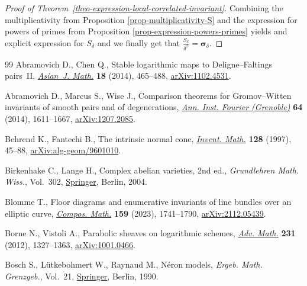 \documentclass[11pt]{article}
\numberwithin{equation}{section}
\numberwithin{equation}{section}
\theoremstyle{definition}
\begin{document}
\begin{proof}[Proof of Theorem~\ref{theo-expression-local-correlated-invariant}]
Combining the multiplicativity from Proposition \ref{prop-multiplicativity-S} and the expression for powers of primes from Proposition \ref{prop-expression-powers-primes} yields and explicit expression for $S_\delta$ and we finally get that $\frac{S_\delta}{\delta^2}=\boldsymbol{\sigma}_\delta$.
\end{proof}
\begin{thebibliography}{99}
Abramovich D., Chen Q., Stable logarithmic maps to {D}eligne--{F}altings
 pairs~{II},
 \href{https://doi.org/10.4310/AJM.2014.v18.n3.a5}{\textit{Asian~J. Math.}}
 \textbf{18} (2014), 465--488,
 \href{http://arxiv.org/abs/1102.4531}{arXiv:1102.4531}.

Abramovich D., Marcus S., Wise J., Comparison theorems for {G}romov--{W}itten
 invariants of smooth pairs and of degenerations,
 \href{https://doi.org/10.5802/aif.2892}{\textit{Ann. Inst. Fourier
 (Grenoble)}} \textbf{64} (2014), 1611--1667,
 \href{http://arxiv.org/abs/1207.2085}{arXiv:1207.2085}.

Behrend K., Fantechi B., The intrinsic normal cone,
 \href{https://doi.org/10.1007/s002220050136}{\textit{Invent. Math.}}
 \textbf{128} (1997), 45--88,
 \href{http://arxiv.org/abs/alg-geom/9601010}{arXiv:alg-geom/9601010}.

Birkenhake C., Lange H., Complex abelian varieties, 2nd ed., \textit{Grundlehren Math.
 Wiss.}, Vol.~302,
 \href{https://doi.org/10.1007/978-3-662-06307-1}{Springer}, Berlin, 2004.

Blomme T., Floor diagrams and enumerative invariants of line bundles over an
 elliptic curve,
 \href{https://doi.org/10.1112/s0010437x23007285}{\textit{Compos. Math.}}
 \textbf{159} (2023), 1741--1790,
 \href{http://arxiv.org/abs/2112.05439}{arXiv:2112.05439}.

Borne N., Vistoli A., Parabolic sheaves on logarithmic schemes,
 \href{https://doi.org/10.1016/j.aim.2012.06.015}{\textit{Adv. Math.}}
 \textbf{231} (2012), 1327--1363,
 \href{http://arxiv.org/abs/1001.0466}{arXiv:1001.0466}.

Bosch S., L\"utkebohmert W., Raynaud M., N\'eron models, \textit{Ergeb. Math.
 Grenzgeb.}, Vol.~21,
 \href{https://doi.org/10.1007/978-3-642-51438-8}{Springer}, Berlin, 1990.


\end{thebibliography}
\end{document}
